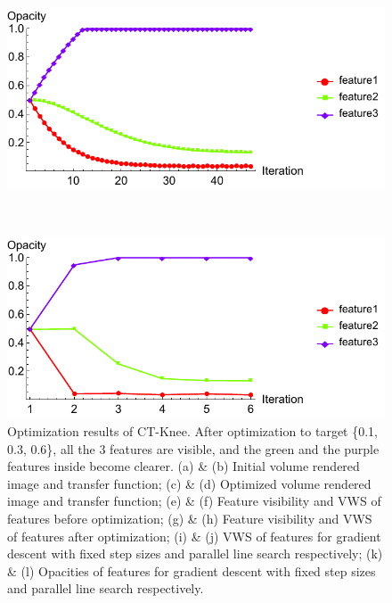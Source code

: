\begin{figure}
	\begin{minipage}{.49\textwidth}
		\includegraphics[width=1\linewidth]{figures/CT-Knee_naive_opacity_fixed}
		\subcaption{}
	\end{minipage}~
	\begin{minipage}{.49\textwidth}
		\includegraphics[width=1\linewidth]{figures/CT-Knee_naive_opacity_parallelsearch}
		\subcaption{}
	\end{minipage}
	\caption[Optimization results of CT-Knee]{Optimization results of CT-Knee. After optimization to target \{0.1, 0.3, 0.6\}, all the 3 features are visible, and the green and the purple features inside become clearer.
	(a) \& (b) Initial volume rendered image and transfer function; (c) \& (d) Optimized volume rendered image and transfer function; (e) \& (f) Feature visibility and VWS of features before optimization; (g) \& (h) Feature visibility and VWS of features after optimization; (i) \& (j) VWS of features for gradient descent with fixed step sizes and parallel line search respectively; (k) \& (l) Opacities of features for gradient descent with fixed step sizes and parallel line search respectively.}
	\label{fig:CT-Knee_naive_optimized}
\end{figure}

